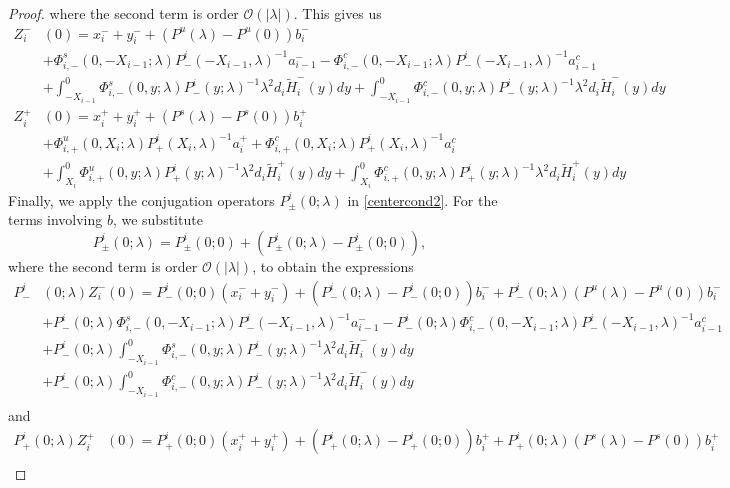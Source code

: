 \documentclass[thesis.tex]{subfiles}
\begin{document}
\begin{lemma}
\begin{proof}
where the second term is order $\mathcal{O}(|\lambda|)$. This gives us
\begin{align*}
Z_i^-&(0) = x_i^- + y_i^- + (P^u(\lambda) - P^u(0))b_i^- \\
&+ \Phi^s_{i,-}(0, -X_{i-1}; \lambda) P^i_-(-X_{i-1}, \lambda)^{-1} a_{i-1}^- - \Phi^c_{i,-}(0, -X_{i-1}; \lambda) P^i_-(-X_{i-1}, \lambda)^{-1} a_{i-1}^c \\
&+ \int_{-X_{i-1}}^0 \Phi^s_{i,-}(0, y; \lambda) P^i_-(y; \lambda)^{-1} \lambda^2 d_i \tilde{H}_i^-(y) dy 
+ \int_{-X_{i-1}}^0 \Phi^c_{i,-}(0, y; \lambda) P^i_-(y; \lambda)^{-1} \lambda^2 d_i \tilde{H}_i^-(y) dy \\
Z_i^+&(0) = x_i^+ + y_i^+ + (P^s(\lambda) - P^s(0)) b_i^+ \\
&+\Phi^u_{i,+}(0, X_i; \lambda) P^i_+(X_i, \lambda)^{-1} a_i^+ + \Phi^c_{i,+}(0, X_i; \lambda) P^i_+(X_i, \lambda)^{-1} a_i^c \\
&+ \int_{X_i}^0 \Phi^u_{i,+}(0, y; \lambda) P^i_+(y; \lambda)^{-1} \lambda^2 d_i \tilde{H}_i^+(y) dy 
+ \int_{X_i}^0 \Phi^c_{i,+}(0, y; \lambda) P^i_+(y; \lambda)^{-1} \lambda^2 d_i \tilde{H}_i^+(y) dy 
\end{align*}
Finally, we apply the conjugation operators $P^i_\pm(0; \lambda)$ in \eqref{centercond2}. For the terms involving $b$, we substitute
\[
P^i_\pm(0; \lambda) = P^i_\pm(0; 0) + (P^i_\pm(0; \lambda) - P^i_\pm(0; 0)),
\]
where the second term is order $\mathcal{O}(|\lambda|)$, to obtain the expressions
\begin{align*}
P^i_-&(0; \lambda) Z_i^-(0) = P^i_-(0; 0)(x_i^- + y_i^-) + (P^i_-(0; \lambda) - P^i_-(0; 0))b_i^- + P^i_-(0; \lambda)(P^u(\lambda) - P^u(0))b_i^- \\
&+ P^i_-(0; \lambda) \Phi^s_{i,-}(0, -X_{i-1}; \lambda) P^i_-(-X_{i-1}, \lambda)^{-1} a_{i-1}^- - P^i_-(0; \lambda) \Phi^c_{i,-}(0, -X_{i-1}; \lambda) P^i_-(-X_{i-1}, \lambda)^{-1} a_{i-1}^c \\
&+ P^i_-(0; \lambda) \int_{-X_{i-1}}^0 \Phi^s_{i,-}(0, y; \lambda) P^i_-(y; \lambda)^{-1} \lambda^2 d_i \tilde{H}_i^-(y) dy \\
&+ P^i_-(0; \lambda) \int_{-X_{i-1}}^0 \Phi^c_{i,-}(0, y; \lambda) P^i_-(y; \lambda)^{-1} \lambda^2 d_i \tilde{H}_i^-(y) dy  \\
\end{align*}
and
\begin{align*}
P^i_+(0; \lambda) Z_i^+&(0) = P^i_+(0; 0)(x_i^+ + y_i^+) + (P^i_+(0; \lambda) - P^i_+(0; 0))b_i^+ + P^i_+(0; \lambda) (P^s(\lambda) - P^s(0)) b_i^+ \\

\end{align*}
\end{proof}
\end{lemma}
\end{document}
